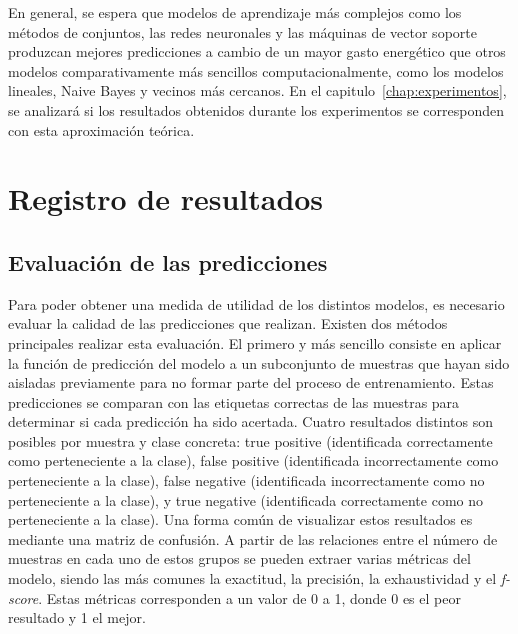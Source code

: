 En general, se espera que modelos de aprendizaje más complejos como los métodos de conjuntos, las redes neuronales y las máquinas de vector soporte produzcan mejores predicciones a cambio de un mayor gasto energético que otros modelos comparativamente más sencillos computacionalmente, como los modelos lineales, Naive Bayes y vecinos más cercanos. En el capitulo~\ref{chap:experimentos}, se analizará si los resultados obtenidos durante los experimentos se corresponden con esta aproximación teórica.


\section{Registro de resultados}

\subsection{Evaluación de las predicciones}
\label{sec:scoring}


Para poder obtener una medida de utilidad de los distintos modelos, es necesario evaluar la calidad de las predicciones que realizan. Existen dos métodos principales realizar esta evaluación. El primero y más sencillo consiste en aplicar la función de predicción del modelo a un subconjunto de muestras que hayan sido aisladas previamente para no formar parte del proceso de entrenamiento. Estas predicciones se comparan con las etiquetas correctas de las muestras para determinar si cada predicción ha sido acertada.
Cuatro resultados distintos son posibles por muestra y clase concreta: true positive (identificada correctamente como perteneciente a la clase), false positive (identificada incorrectamente como perteneciente a la clase), false negative (identificada incorrectamente como no perteneciente a la clase), y true negative (identificada correctamente como no perteneciente a la clase). Una forma común de visualizar estos resultados es mediante una matriz de confusión. 
A partir de las relaciones entre el número de muestras en cada uno de estos grupos se pueden extraer varias métricas del modelo, siendo las más comunes la exactitud, la precisión, la exhaustividad y el \emph{f-score}\cite{scikit-model-eval}. Estas métricas corresponden a un valor de 0 a 1, donde 0 es el peor resultado y 1 el mejor.


